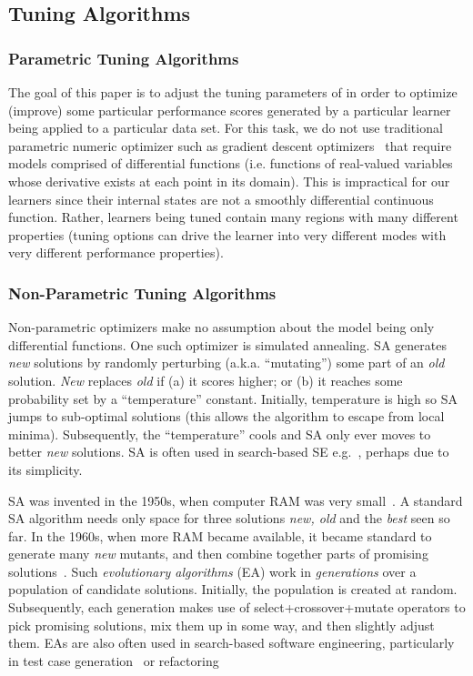 \subsection{Tuning Algorithms}


 \subsubsection{Parametric Tuning Algorithms}
The  goal of this paper is to adjust the tuning parameters of 
in order to   optimize (improve) some particular performance scores
generated by a particular learner being applied to  a particular data set.
For this task, we do not use traditional parametric numeric optimizer  
such as  gradient descent optimizers~\cite{saltelli00} that require models comprised of
differential functions (i.e. functions of real-valued variables whose derivative exists at each point in its domain).
This is impractical  for  our learners since their internal states are   not a smoothly differential continuous function.
Rather, learners being tuned  contain many regions with many different properties (tuning options can
drive the learner into very different modes with very different performance properties).


 \subsubsection{Non-Parametric Tuning Algorithms}
 
Non-parametric  optimizers   make no assumption
about the model being only differential functions. One such optimizer
is simulated annealing. SA generates {\em new} solutions
 by randomly perturbing (a.k.a. ``mutating'') some part of an {\em old}
 solution.  {\em New} replaces {\em old} if (a) it scores higher; or
 (b) it reaches some probability set by a ``temperature'' constant. Initially,
 temperature is high so SA jumps to sub-optimal solutions (this allows
 the algorithm to escape from local minima). Subsequently, the
 ``temperature'' cools and SA only ever moves to better {\em new}
 solutions. 
 SA is often used in search-based SE
 e.g.~\cite{fea02a,me07f}, perhaps due to its simplicity.

SA was invented   in the 1950s, when
 computer RAM was very small~\cite{kirkpatrick83}. A standard SA algorithm needs
 only space for three solutions {\em new, old} and the {\em best} seen so far.
  In the 1960s, when more RAM became available, it became standard to
 generate many {\em new} mutants, and then combine together parts of
 promising solutions~\cite{goldberg79}.  Such {\em evolutionary
   algorithms} (EA) work in {\em generations} over a population of
 candidate solutions.  Initially, the population is created at random.
 Subsequently, each generation makes use of select+crossover+mutate
 operators to pick promising solutions, mix them up in some way, and
 then slightly adjust them.
 EAs are also often used in search-based
 software engineering, particularly in test case generation~\cite{andrews07,andrews10}
 or refactoring~\cite{Weimer:2009}

